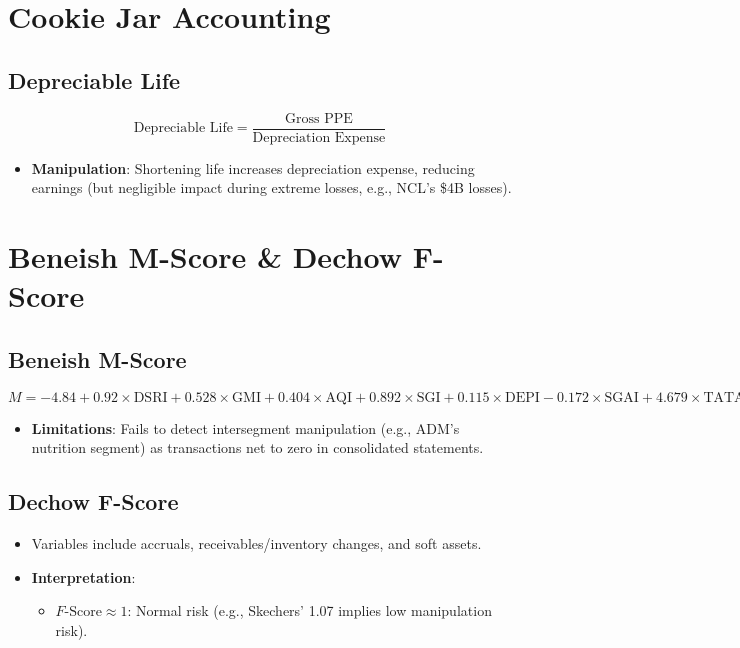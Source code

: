 \documentclass{article}
\begin{document}
\section{Cookie Jar Accounting}
\subsection{Depreciable Life}
\[
\text{Depreciable Life} = \frac{\text{Gross PPE}}{\text{Depreciation Expense}}
\]
\begin{itemize}
    \item \textbf{Manipulation}: Shortening life increases depreciation expense, reducing earnings (but negligible impact during extreme losses, e.g., NCL’s \$4B losses).
\end{itemize}

\section{Beneish M-Score \& Dechow F-Score}
\subsection{Beneish M-Score}
\[
M = -4.84 + 0.92 \times \text{DSRI} + 0.528 \times \text{GMI} + 0.404 \times \text{AQI} + 0.892 \times \text{SGI} + 0.115 \times \text{DEPI} - 0.172 \times \text{SGAI} + 4.679 \times \text{TATA} - 0.327 \times \text{LVGI}
\]
\begin{itemize}
    \item \textbf{Limitations}: Fails to detect intersegment manipulation (e.g., ADM’s nutrition segment) as transactions net to zero in consolidated statements.
\end{itemize}

\subsection{Dechow F-Score}
\begin{itemize}
    \item Variables include accruals, receivables/inventory changes, and soft assets.
    \item \textbf{Interpretation}: 
    \begin{itemize}
        \item $F\text{-Score} \approx 1$: Normal risk (e.g., Skechers’ 1.07 implies low manipulation risk).
    \end{itemize}
\end{itemize}
\end{document}
